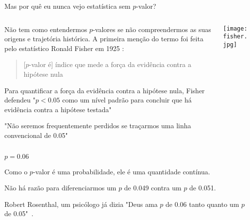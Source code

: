 \begin{frame}{Mas por quê eu nunca vejo estatística sem $p$-valor?}
    \begin{columns}
        \begin{column}{0.8\textwidth}
            Não tem como entendermos $p$-valores se não compreendermos as suas
            origens e trajetória histórica. A primeira menção do termo foi feita
            pelo estatístico Ronald Fisher em 1925 \parencite{fisher1925statistical}:
            \begin{quotation}
                [$p$-valor é] índice que mede a força da evidência contra a hipótese nula
            \end{quotation}
            \begin{vfilleditems}
                \item Para quantificar a força da evidência contra a hipótese nula, Fisher defendeu
                "$p<0.05$ como um nível padrão para concluir que há evidência contra a hipótese testada"
                \item "Não seremos frequentemente perdidos se traçarmos uma linha convencional de 0.05"
            \end{vfilleditems}
        \end{column}
        \begin{column}{0.2\textwidth}
            \centering
            \texttt{[image: fisher.jpg]}
        \end{column}
    \end{columns}
\end{frame}

\begin{frame}{$p = 0.06$}
    \begin{vfilleditems}
        \item Como o $p$-valor é uma probabilidade, ele é uma quantidade contínua.
        \item Não há razão para diferenciarmos um $p$ de 0.049 contra um $p$ de 0.051.
        \item Robert Rosenthal, um psicólogo já dizia "Deus ama $p$ de 0.06 tanto quanto um $p$ de 0.05"~\parencite{rosnow1989statistical}.
    \end{vfilleditems}
\end{frame}

